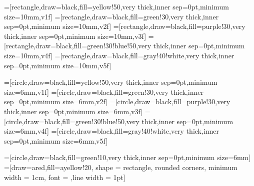 \newcommand{\drawoffset}[2]{
  \draw[ared,fill=red!20,fill opacity=0.3] (#1,-0.1) rectangle 
       +(1,1.2) node[opacity=1,draw=ablue,fill=ablue!20,rectangle,inner sep=2pt,font=\footnotesize]{#2};
  \path[draw=ared,thick,->](#1.5,-0.1) -- +(-#2,-1.8);
}
\newcommand{\drawoffsetmk}[3]{
  \draw[ared,fill=ared!20,fill opacity=0.3] (#1,-0.1) rectangle 
       +(1,1.2) node[opacity=1,draw=ablue,fill=ablue!20,rectangle,inner sep=2pt,font=\footnotesize]{#2};
  \path[draw=ared,thick,->](#1.5,-0.1) -- node[inner sep=2pt,fill=white,font=\large]{\alert{#3}} +(-#2,-1.8);
}
\newcommand{\dcalloutw}[5][]{
  \path(#2) node[below right,rectangle callout,draw=ayellow,v1f, callout absolute pointer={(#3)},#1] 
      {\noteboxsc{#5}{#4}}; 
}
\newcommand{\dcalloutten}[4][]{
  \dcalloutw[#1]{#2}{#3}{#4}{10em}
}


\newcommand{\vplus}[2]{\setcounter{ada@tem}{#1}\addtocounter{ada@tem}{#2}\arabic{ada@tem}}


=[rectangle,draw=black,fill=yellow!50,very thick,inner sep=0pt,minimum size=10mm,v1f]
=[rectangle,draw=black,fill=green!30,very thick,inner sep=0pt,minimum size=10mm,v2f]
=[rectangle,draw=black,fill=purple!30,very thick,inner sep=0pt,minimum size=10mm,v3f]
=[rectangle,draw=black,fill=green!30!blue!50,very thick,inner sep=0pt,minimum size=10mm,v4f]
=[rectangle,draw=black,fill=gray!40!white,very thick,inner sep=0pt,minimum size=10mm,v5f]

=[circle,draw=black,fill=yellow!50,very thick,inner sep=0pt,minimum size=6mm,v1f]
=[circle,draw=black,fill=green!30,very thick,inner sep=0pt,minimum size=6mm,v2f]
=[circle,draw=black,fill=purple!30,very thick,inner sep=0pt,minimum size=6mm,v3f]
=[circle,draw=black,fill=green!30!blue!50,very thick,inner sep=0pt,minimum size=6mm,v4f]
=[circle,draw=black,fill=gray!40!white,very thick,inner sep=0pt,minimum size=6mm,v5f]

=[circle,draw=black,fill=green!10,very thick,inner sep=0pt,minimum size=6mm]
=[draw=ared,fill=ayellow!20, shape = rectangle, rounded corners,
      minimum width = 1cm, font = \sffamily,line width = 1pt]


